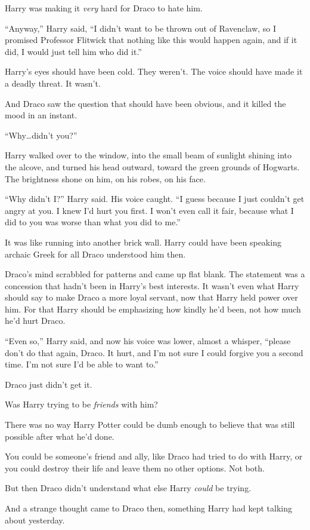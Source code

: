 Harry was making it \emph{very} hard for Draco to hate him.

“Anyway,” Harry said, “I didn’t want to be thrown out of Ravenclaw, so I promised Professor Flitwick that nothing like this would happen again, and if it did, I would just tell him who did it.”

Harry’s eyes should have been cold. They weren’t. The voice should have made it a deadly threat. It wasn’t.

And Draco saw the question that should have been obvious, and it killed the mood in an instant.

“Why…didn’t you?”

Harry walked over to the window, into the small beam of sunlight shining into the alcove, and turned his head outward, toward the green grounds of Hogwarts. The brightness shone on him, on his robes, on his face.

“Why didn’t I?” Harry said. His voice caught. “I guess because I just couldn’t get angry at you. I knew I’d hurt you first. I won’t even call it fair, because what I did to you was worse than what you did to me.”

It was like running into another brick wall. Harry could have been speaking archaic Greek for all Draco understood him then.

Draco’s mind scrabbled for patterns and came up flat blank. The statement was a concession that hadn’t been in Harry’s best interests. It wasn’t even what Harry should say to make Draco a more loyal servant, now that Harry held power over him. For that Harry should be emphasizing how kindly he’d been, not how much he’d hurt Draco.

“Even so,” Harry said, and now his voice was lower, almost a whisper, “please don’t do that again, Draco. It hurt, and I’m not sure I could forgive you a second time. I’m not sure I’d be able to want to.”

Draco just didn’t get it.

Was Harry trying to be \emph{friends} with him?

There was no way Harry Potter could be dumb enough to believe that was still possible after what he’d done.

You could be someone’s friend and ally, like Draco had tried to do with Harry, or you could destroy their life and leave them no other options. Not both.

But then Draco didn’t understand what else Harry \emph{could} be trying.

And a strange thought came to Draco then, something Harry had kept talking about yesterday.

